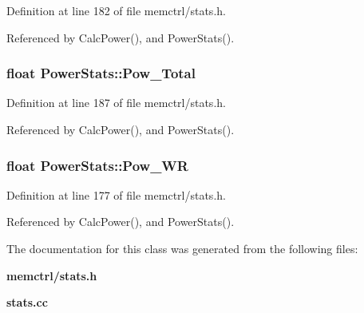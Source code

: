 Definition at line 182 of file memctrl/stats.h.

Referenced by CalcPower(), and PowerStats().
\subsubsection[{Pow\_\-Total}]{\setlength{\rightskip}{0pt plus 5cm}float {\bf PowerStats::Pow\_\-Total}}\label{classPowerStats_6003d7c3cbb9227042d4b166f06852d6}




Definition at line 187 of file memctrl/stats.h.

Referenced by CalcPower(), and PowerStats().
\subsubsection[{Pow\_\-WR}]{\setlength{\rightskip}{0pt plus 5cm}float {\bf PowerStats::Pow\_\-WR}}\label{classPowerStats_2e1b9a14c1af10caedc35e55b69d749a}




Definition at line 177 of file memctrl/stats.h.

Referenced by CalcPower(), and PowerStats().

The documentation for this class was generated from the following files:\begin{CompactItemize}
\item 
{\bf memctrl/stats.h}\item 
{\bf stats.cc}\end{CompactItemize}
